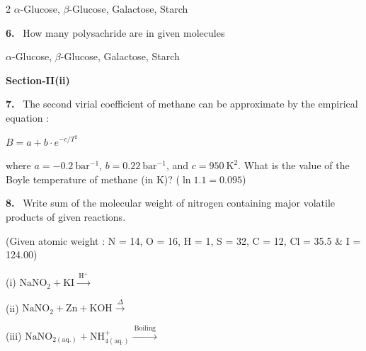 \documentclass[10pt]{extarticle}
\newcommand{\sect}[1]{\par\smallskip\noindent\textbf{#1}\par}
\newcommand{\qn}[1]{\par\smallskip\noindent\textbf{#1.}~}
\begin{document}
\begin{multicols}{2}
$\alpha$-Glucose, $\beta$-Glucose, Galactose, Starch
\qn{6} How many polysachride are in given molecules

$\alpha$-Glucose, $\beta$-Glucose, Galactose, Starch
\sect{Section-II(ii)}
\qn{7} The second virial coefficient of methane can be approximate by the empirical equation :

$B=a+b\cdot e^{-c/T^2}$

where $a=-0.2\ \mathrm{bar^{-1}}$, $b=0.22\ \mathrm{bar^{-1}}$, and $c=950\ \mathrm{K^2}$. What is the value of the Boyle temperature of methane (in K)? ($\ln 1.1=0.095$)
\qn{8} Write sum of the molecular weight of nitrogen containing major volatile products of given reactions.

(Given atomic weight : N = 14, O = 16, H = 1, S = 32, C = 12, Cl = 35.5 \& I = 124.00)

(i) $\mathrm{NaNO_2+KI}\xrightarrow{\ \mathrm{H^+}\ }$

(ii) $\mathrm{NaNO_2+Zn+KOH}\xrightarrow{\ \Delta\ }$

(iii) $\mathrm{NaNO_{2(aq.)}+NH^+_{4(aq.)}}\xrightarrow{\ \mathrm{Boiling}\ }$


\end{multicols}
\end{document}

